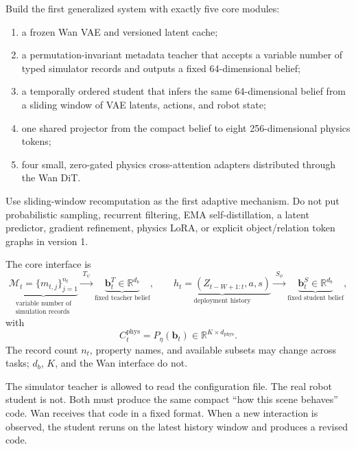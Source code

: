 \documentclass[11pt]{article}
\newcommand{\bvec}{\bm b}
\newcommand{\R}{\mathbb R}
\newcommand{\meta}{\mathcal M}
\begin{document}
\begin{decisionbox}
Build the first generalized system with exactly five core modules:
\begin{enumerate}
  \item a frozen Wan VAE and versioned latent cache;
  \item a permutation-invariant metadata teacher that accepts a variable number
  of typed simulator records and outputs a fixed 64-dimensional belief;
  \item a temporally ordered student that infers the same 64-dimensional belief
  from a sliding window of VAE latents, actions, and robot state;
  \item one shared projector from the compact belief to eight 256-dimensional
  physics tokens;
  \item four small, zero-gated physics cross-attention adapters distributed
  through the Wan DiT.
\end{enumerate}
Use sliding-window recomputation as the first adaptive mechanism.  Do not put
probabilistic sampling, recurrent filtering, EMA self-distillation, a latent
predictor, gradient refinement, physics LoRA, or explicit object/relation token
graphs in version 1.
\end{decisionbox}

The core interface is
\begin{equation}
  \underbrace{\meta_t=\{m_{t,j}\}_{j=1}^{n_t}}_{
  \substack{\text{variable number of}\\\text{simulation records}}}
  \xrightarrow{\;T_\psi\;}
  \underbrace{\bvec_t^T\in\R^{d_b}}_{\text{fixed teacher belief}},
  \qquad
  \underbrace{h_t=(Z_{t-W+1:t},a,s)}_{\text{deployment history}}
  \xrightarrow{\;S_\phi\;}
  \underbrace{\bvec_t^S\in\R^{d_b}}_{\text{fixed student belief}},
  \label{eq:two-paths}
\end{equation}
with
\begin{equation}
  C_t^{\mathrm{phys}}=P_\eta(\bvec_t)\in\R^{K\times d_{\mathrm{phys}}}.
  \label{eq:projector}
\end{equation}
The record count $n_t$, property names, and available subsets may change across
tasks; $d_b$, $K$, and the Wan interface do not.

\begin{plainbox}[title=Plain-language summary]
The simulator teacher is allowed to read the configuration file.  The real
robot student is not.  Both must produce the same compact ``how this scene
behaves'' code.  Wan receives that code in a fixed format.  When a new
interaction is observed, the student reruns on the latest history window and
produces a revised code.
\end{plainbox}
\end{document}
